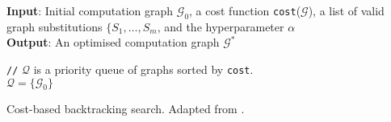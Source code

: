{\SetAlgoNoLine
\begin{algorithm}[htbp]
 \textbf{Input}: Initial computation graph $\mathcal{G}_0$, a cost function \texttt{cost}($\mathcal{G}$), a list of valid graph substitutions $\lbrace S_1, \dots, S_m$, and the hyperparameter $\alpha$ \\

 \textbf{Output}: An optimised computation graph $\mathcal{G}^*$

 \texttt{//} $\mathcal{Q}$ is a priority queue of graphs sorted by \texttt{cost}.\\
 $\mathcal{Q} = \lbrace \mathcal{G}_0 \rbrace$


 \caption{Cost-based backtracking search. Adapted from \cite{jia2019taso}.}
 \label{algo:taso}
\end{algorithm}}